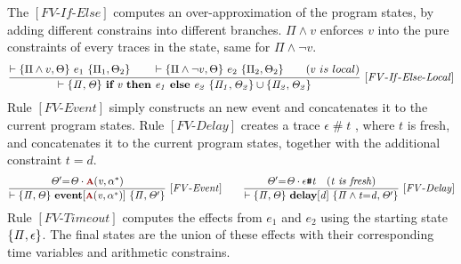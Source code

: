 \documentclass[acmsmall,10pt,review]{acmart}
\newcommand{\anyevent}[1]{{\textcolor{darkred}
{{\textbf{\footnotesize #1}}}}}
\newcommand{\code}[1]{{\tt{\ensuremath{\m{#1}}}}}
\newcommand{\m}{\mathit}
\newcommand{\mysharp}{{\mathrel{\texttt{\#}}}}
\begin{document}
{The \code{[FV\text{-}If\text{-}Else]} computes an 
over-approximation of the program states, by adding different constrains into 
different branches. \code{\Pi \wedge v} enforces 
\code{v} into the pure constraints of every traces in the state, same 
for \code{\Pi \wedge \neg v }.
{{\small\begin{gather*}
  \code{\frac{ 
    \begin{matrix}
\vdash \{ \Pi \wedge v, \Theta    \} \ e_1 \ \{  \Pi_1, \Theta_2 \} 
\qquad 
\vdash \{ \Pi \wedge \neg v , \Theta  \} \ e_2 \ 
\{  \Pi_2, \Theta_2 \}  
\qquad (v\ is\ local)
\end{matrix}}
  {\vdash \s{ \Pi, \Theta}\  \textbf{if}\ v\ \textbf{then}\ e_1\ 
  \textbf{else}\ e_2 \ \s{ \Pi_1, \Theta_2} \cup \s{\Pi_2, \Theta_2} } \  
  {[FV\text{-}If\text{-}Else\text{-}Local]}} 
  \end{gather*}}}
Rule \code{[FV\text{-}Event]} simply constructs an new event and 
concatenates it to the current program states. 
Rule \code{[FV\text{-}Delay]} creates a trace \code{\epsilon\mysharp t}
, where \code{t} is fresh, and concatenates it to the current program states, 
together with the additional constraint \code{t{=}d}. 
  {{\small\begin{gather*}
  \code{\frac{
    \Theta^\prime {=} \Theta\cdot \anyevent{A}(v, \alpha^*) 
    }
  {\vdash \s{ \Pi, \Theta} \  
  \textbf{event} [\anyevent{A}(v, \alpha^*)] 
   \ \{\Pi, \Theta^\prime \}} \   {[FV\text{-}Event]}} 
   \qquad
  \code{\frac{
    \Theta^\prime {=} \Theta\cdot \epsilon\mysharp t \quad (t\ is\ fresh) 
    }
  {\vdash \s{ \Pi, \Theta} \  
  \textbf{delay} [d] 
   \ \{ \Pi \wedge  t {=}d,  \Theta^\prime \}} \   {[FV\text{-}Delay]}} 
\end{gather*}}}
Rule \code{[FV\text{-}Timeout]} computes the effects from \code{e_1} and \code{e_2}
using the starting state \code{\s{\Pi, \epsilon}}. The final states are the union 
of these effects with their corresponding time variables and arithmetic constrains. 
{{\small\begin{gather*}

\end{gather*}}}}
\end{document}
